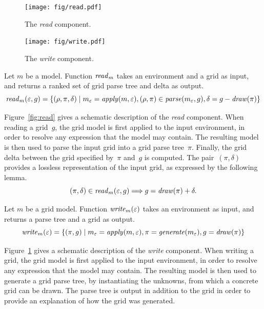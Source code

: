 \documentclass[a4paper]{llncs}
\begin{document}
\begin{figure}[t]
  \centering
  \begin{minipage}[b]{0.55\textwidth}
    \centering
    \texttt{[image: fig/read.pdf]}
    \caption{The {\em read} component.}
    \label{fig:read}
  \end{minipage}
  \hfill
  \begin{minipage}[b]{0.44\textwidth}
    \centering
    \texttt{[image: fig/write.pdf]}
    \caption{The {\em write} component.}
    \label{fig:write}
  \end{minipage}
\end{figure}

\begin{definition}
  Let $m$ be a model. Function ${\it read}_m$ takes an environment and
  a grid as input, and returns a ranked set of grid parse tree and delta as output.
  \[ {\it read}_m(\varepsilon,g) = \{ (\rho,\pi,\delta) \mid m_\varepsilon
    = {\it apply}(m,\varepsilon), (\rho, \pi) \in {\it
      parse}(m_\varepsilon,g), \delta = g - {\it draw}(\pi) \} \]
\end{definition}

Figure~\ref{fig:read} gives a schematic description of the {\em read}
component. When reading a grid~$g$, the grid model is first applied to
the input environment, in order to resolve any expression that the
model may contain. The resulting model is then used to parse the input
grid into a grid parse tree~$\pi$. Finally, the grid delta between the
grid specified by~$\pi$ and~$g$ is computed. The pair~$(\pi,\delta)$
provides a lossless representation of the input grid, as expressed by
the following lemma.
\[ (\pi,\delta) \in {\it read}_m(\varepsilon,g) \Longrightarrow g =
  {\it draw}(\pi) + \delta. \] %


\begin{definition}
  Let $m$ be a grid model. Function ${\it write}_m(\varepsilon)$ takes
  an environment as input, and returns a parse tree and a grid as
  output.
  \[ {\it write}_m(\varepsilon) = \{ (\pi,g) \mid m_\varepsilon = {\it
      apply}(m,\varepsilon), \pi = {\it generate}(m_\varepsilon), g =
    {\it draw}(\pi) \} \]
\end{definition}

Figure~\ref{fig:write} gives a schematic description of the {\em
  write} component. When writing a grid, the grid model is first
applied to the input environment, in order to resolve any expression
that the model may contain. The resulting model is then used to
generate a grid parse tree, by instantiating the unknowns, from which
a concrete grid can be drawn. The parse tree is output in addition to
the grid in order to provide an explanation of how the grid was
generated.
\end{document}
